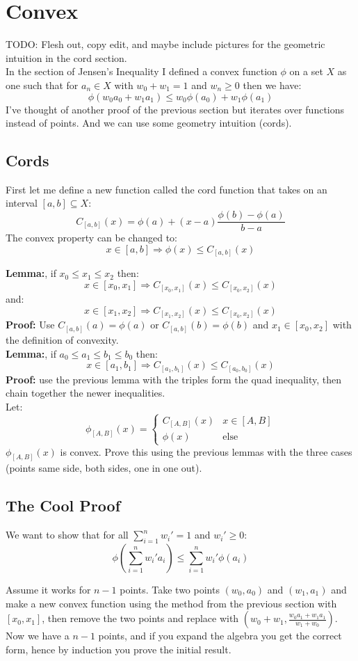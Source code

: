 
\section{Convex}
TODO: Flesh out, copy edit, and maybe include pictures for the geometric intuition in the cord section.
\\

In the section of Jensen's Inequality I defined a convex function $\phi$ on a set $X$ as one such that for $a_n\in X$ with $w_0+w_1 =1$ and $w_n \geq 0$ then we have:
\[\phi(w_0a_0+w_1a_1) \leq w_0\phi(a_0)+w_1\phi(a_1)\]
I've thought of another proof of the previous section but iterates over functions instead of points.
And we can use some geometry intuition (cords).
\\

\subsection{Cords}
First let me define a new function called the cord function that takes on an interval $[a,b] \subseteq X$:
\[C_{[a,b]}(x) = \phi(a)+(x-a)\frac{\phi(b)-\phi(a)}{b-a}\]
The convex property can be changed to:
\[x\in [a,b] \Rightarrow \phi(x) \leq C_{[a,b]}(x)\]

{\bf Lemma:}, if $x_0 \leq x_1 \leq x_2$ then:
\[ x\in [x_0,x_1] \Rightarrow C_{[x_0,x_1]}(x) \leq C_{[x_0,x_2]}(x)\]
and:
\[ x\in [x_1,x_2] \Rightarrow C_{[x_1,x_2]}(x) \leq C_{[x_0,x_2]}(x)\]
{\bf Proof:} Use $C_{[a,b]}(a) = \phi(a)$ or $C_{[a,b]}(b) = \phi(b)$ and $x_1 \in [x_0,x_2]$ with the definition of convexity.
\\

{\bf Lemma:}, if $a_0 \leq a_1 \leq b_1 \leq b_0$ then:
\[x\in [a_1,b_1] \Rightarrow C_{[a_1,b_1]}(x) \leq C_{[a_0,b_0]}(x)\]
{\bf Proof:} use the previous lemma with the triples form the quad inequality, then chain together the newer inequalities.
\\

Let:
\[\phi_{[A,B]}(x) = \begin{cases} C_{[A,B]}(x) & x\in [A,B] \\ \phi(x) &\text{else} \end{cases}\]
$\phi_{[A,B]}(x)$ is convex.
Prove this using the previous lemmas with the three cases (points same side, both sides, one in one out).

\subsection{The Cool Proof}
We want to show that for all $\sum_{i=1}^nw_i'=1$ and $w_i' \geq 0$:
\[\phi\left(\sum_{i=1}^nw_i'a_i\right) \leq \sum_{i=1}^nw_i'\phi(a_i)\]

Assume it works for $n-1$ points.
Take two points $(w_0,a_0)$ and $(w_1,a_1)$ and make a new convex function using the method from the previous section with $[x_0,x_1]$, then remove the two points and replace with $(w_0+w_1, \frac{w_0a_1+w_1a_1}{w_1+w_0})$.
Now we have a $n-1$ points,
and if you expand the algebra you get the correct form,
hence by induction you prove the initial result.
